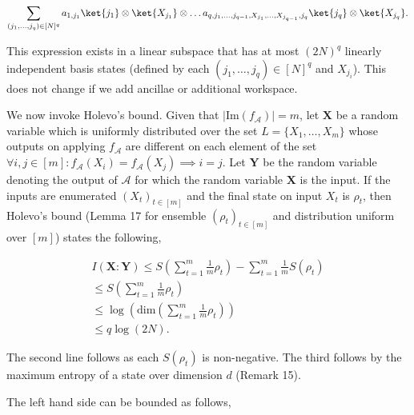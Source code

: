 \documentclass[10pt,a4paper]{article}
\begin{document}
\[\begin{gathered}
\sum_{(j_{1},\ldots,j_{q})\in[N]^{q}}a_{1,j_{1}}\ket{j_{1}}\otimes\ket{X_{j_{1}}}\otimes\ldots a_{q,j_{1},\ldots,j_{q-1},X_{j_{1}},\ldots,X_{j_{q-1}},j_{q}}\ket{j_{q}}\otimes\ket{X_{j_{q}}}.
\end{gathered}\]




This expression exists in a linear subspace that has at most $(2N)^{q}$ linearly independent basis states (defined by each $(j_{1},\ldots,j_{q})\in[N]^{q}$ and $X_{j_{i}}$). This does not change if we add ancillae or additional workspace.\par




We now invoke Holevo’s bound. Given that $|\mathrm{Im}(f_{\mathcal{A}})|=m$,
let $\mathbf{X}$ be a random variable which is uniformly distributed over the set $L=\{X_{1},\ldots,X_{m}\}$
whose outputs on applying $f_{\mathcal{A}}$ are different on each element of the set $\forall i,j\in[m]:f_{\mathcal{A}}(X_{i})=f_{\mathcal{A}}(X_{j})\implies i=j$. Let $\mathbf{Y}$ be the random variable denoting the output of $\mathcal{A}$ for which the random variable $\mathbf{X}$ is the input. If the inputs are enumerated $(X_{t})_{t\in[m]}$ and the final state on input $X_{t}$ is $\rho_{t}$, then Holevo’s bound (Lemma 17 for ensemble $(\rho_{t})_{t\in[m]}$ and distribution uniform over $[m]$) states the following,\par




\[\begin{gathered}
\displaystyle I(\mathbf{X}:\mathbf{Y}) \displaystyle\leq S\left(\sum_{t=1}^{m}\frac{1}{m}\rho_{t}\right)-\sum_{t=1}^{m}\frac{1}{m}S(\rho_{t}) \\
\displaystyle\leq S\left(\sum_{t=1}^{m}\frac{1}{m}\rho_{t}\right) \\
\displaystyle\leq\log\left(\text{dim}\left(\sum_{t=1}^{m}\frac{1}{m}\rho_{t}\right)\right) \\
\displaystyle\leq q\log(2N).
\end{gathered}\]




The second line follows as each $S(\rho_{t})$ is non-negative. The third follows by the maximum entropy of a state over dimension $d$ (Remark 15).\par




The left hand side can be bounded as follows,\par
\end{document}

